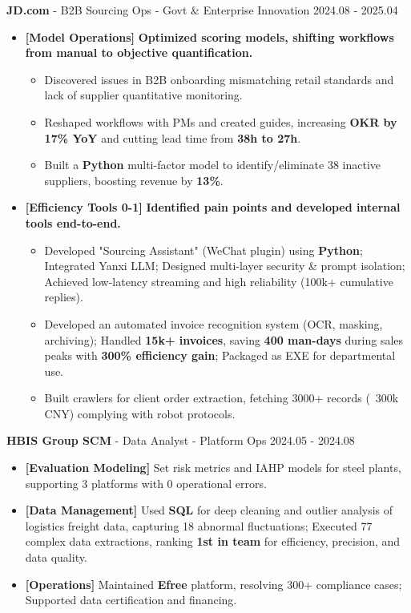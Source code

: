 \documentclass[10pt,a4paper]{article}
\begin{document}
{\fontsize{12pt}{14.4pt}\selectfont\noindent\textbf{JD.com} - B2B Sourcing Ops - Govt \& Enterprise Innovation \hfill 2024.08 - 2025.04\par}
\begin{itemize}[leftmargin=1em, label=, itemsep=0.35ex, topsep=0.05ex]
\item {\fontsize{10.5pt}{12pt}\selectfont\textbf{[Model Operations]}} \textbf{Optimized scoring models, shifting workflows from manual to objective quantification.}
  \begin{itemize}
    \item Discovered issues in B2B onboarding mismatching retail standards and lack of supplier quantitative monitoring.
    \item Reshaped workflows with PMs and created guides, increasing \textbf{OKR by 17\% YoY} and cutting lead time from \textbf{38h to 27h}.
    \item Built a \textbf{Python} multi-factor model to identify/eliminate 38 inactive suppliers, boosting revenue by \textbf{13\%}.
  \end{itemize}
\item {\fontsize{10.5pt}{12pt}\selectfont\textbf{[Efficiency Tools 0-1]}} \textbf{Identified pain points and developed internal tools end-to-end.}
  \begin{itemize}
    \item Developed "Sourcing Assistant" (WeChat plugin) using \textbf{Python}; Integrated Yanxi LLM; Designed multi-layer security \& prompt isolation; Achieved low-latency streaming and high reliability (100k+ cumulative replies).
    \item Developed an automated invoice recognition system (OCR, masking, archiving); Handled \textbf{15k+ invoices}, saving \textbf{400 man-days} during sales peaks with \textbf{300\% efficiency gain}; Packaged as EXE for departmental use.
    \item Built crawlers for client order extraction, fetching 3000+ records (~300k CNY) complying with robot protocols.
  \end{itemize}
\end{itemize}
\vspace{0.2ex}

{\fontsize{12pt}{14.4pt}\selectfont\noindent\textbf{HBIS Group SCM} - Data Analyst - Platform Ops \hfill 2024.05 - 2024.08\par}
\begin{itemize}[leftmargin=1em, label=, itemsep=0.35ex, topsep=0.05ex]
\item \textbf{[Evaluation Modeling]} Set risk metrics and IAHP models for steel plants, supporting 3 platforms with 0 operational errors.
\item \textbf{[Data Management]} Used \textbf{SQL} for deep cleaning and outlier analysis of logistics freight data, capturing 18 abnormal fluctuations; Executed 77 complex data extractions, ranking \textbf{1st in team} for efficiency, precision, and data quality.
\item \textbf{[Operations]} Maintained \textbf{Efree} platform, resolving 300+ compliance cases; Supported data certification and financing.
\end{itemize}
\end{document}
